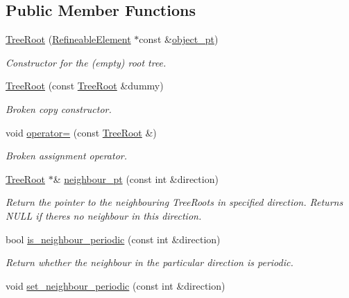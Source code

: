 \subsection*{Public Member Functions}
\begin{DoxyCompactItemize}
\item 
\hyperlink{classoomph_1_1TreeRoot_a9220f966655424676f4a5710b016c23d}{Tree\+Root} (\hyperlink{classoomph_1_1RefineableElement}{Refineable\+Element} $\ast$const \&\hyperlink{classoomph_1_1Tree_a2f2eeb0f1dd161f696cccc652974ff4c}{object\+\_\+pt})
\begin{DoxyCompactList}\small\item\em Constructor for the (empty) root tree. \end{DoxyCompactList}\item 
\hyperlink{classoomph_1_1TreeRoot_abadadc75e4d5b3398306579bb1eb76a7}{Tree\+Root} (const \hyperlink{classoomph_1_1TreeRoot}{Tree\+Root} \&dummy)
\begin{DoxyCompactList}\small\item\em Broken copy constructor. \end{DoxyCompactList}\item 
void \hyperlink{classoomph_1_1TreeRoot_a1a600f35a0134eafe193d0996b2c7cd3}{operator=} (const \hyperlink{classoomph_1_1TreeRoot}{Tree\+Root} \&)
\begin{DoxyCompactList}\small\item\em Broken assignment operator. \end{DoxyCompactList}\item 
\hyperlink{classoomph_1_1TreeRoot}{Tree\+Root} $\ast$\& \hyperlink{classoomph_1_1TreeRoot_a1b03a77d1231ef49f236a97374c15d6b}{neighbour\+\_\+pt} (const int \&direction)
\begin{DoxyCompactList}\small\item\em Return the pointer to the neighbouring Tree\+Roots in specified direction. Returns N\+U\+LL if there\textquotesingle{}s no neighbour in this direction. \end{DoxyCompactList}\item 
bool \hyperlink{classoomph_1_1TreeRoot_a7be347e54e34f924c008c302f5146064}{is\+\_\+neighbour\+\_\+periodic} (const int \&direction)
\begin{DoxyCompactList}\small\item\em Return whether the neighbour in the particular direction is periodic. \end{DoxyCompactList}\item 
void \hyperlink{classoomph_1_1TreeRoot_ad4a2c51b2b42261bd8dde67ca32c594c}{set\+\_\+neighbour\+\_\+periodic} (const int \&direction)

\end{DoxyCompactItemize}
